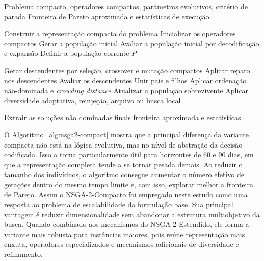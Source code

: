 \begin{algoritmo}
    \caption{NSGA-2-Compacto para alocação de médicos}
    \label{alg:nsga2-compact}
    \begin{algorithmic}[1]
        \Require Problema compacto, operadores compactos, parâmetros evolutivos, critério de parada
        \Ensure Fronteira de Pareto aproximada e estatísticas de execução

        \State Construir a representação compacta do problema
        \State Inicializar os operadores compactos
        \State Gerar a população inicial
        \State Avaliar a população inicial por decodificação e expansão
        \State Definir a população corrente $P$

        \State Gerar descendentes por seleção, crossover e mutação compactos
        \State Aplicar reparo nos descendentes
        \EndIf
        \State Avaliar os descendentes
        \State Unir pais e filhos
        \State Aplicar ordenação não-dominada e \textit{crowding distance}
        \State Atualizar a população sobrevivente
        \State Aplicar diversidade adaptativa, reinjeção, arquivo ou busca local
        \EndIf
        \EndWhile

        \State Extrair as soluções não dominadas finais
        \State \Return fronteira aproximada e estatísticas
    \end{algorithmic}
\end{algoritmo}

O Algoritmo~\ref{alg:nsga2-compact} mostra que a principal diferença da variante compacta não está na lógica evolutiva, mas no nível de abstração da decisão codificada. Isso a torna particularmente útil para horizontes de 60 e 90 dias, em que a representação completa tende a se tornar pesada demais. Ao reduzir o tamanho dos indivíduos, o algoritmo consegue aumentar o número efetivo de gerações dentro do mesmo tempo limite e, com isso, explorar melhor a fronteira de Pareto. Assim o NSGA-2-Compacto foi empregado neste estudo como uma resposta ao problema de escalabilidade da formulação base. Sua principal vantagem é reduzir dimensionalidade sem abandonar a estrutura multiobjetivo da busca. Quando combinado aos mecanismos do NSGA-2-Estendido, ele forma a variante mais robusta para instâncias maiores, pois reúne representação mais enxuta, operadores especializados e mecanismos adicionais de diversidade e refinamento.